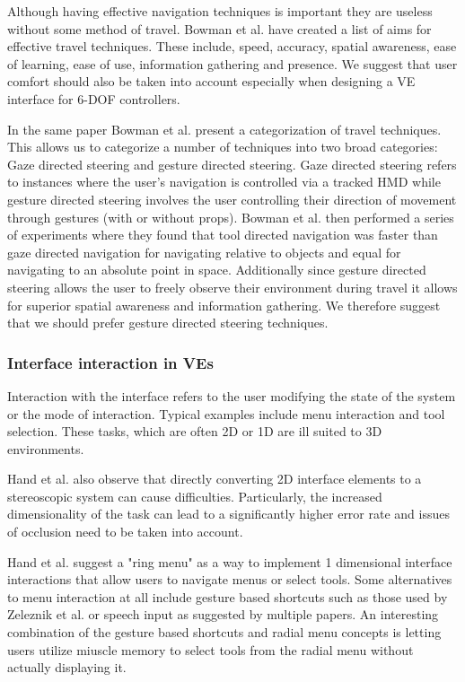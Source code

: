 \documentclass{sig-alternate-05-2015}
\begin{document}
Although having effective navigation techniques is important they are useless without some method of travel. Bowman et al. have created a list of aims for effective travel techniques.\cite{Bowman1997} These include, speed, accuracy, spatial awareness, ease of learning, ease of use, information gathering and presence. We suggest that user comfort should also be taken into account especially when designing a VE interface for 6-DOF controllers.

 In the same paper Bowman et al. present a categorization of travel techniques\cite{Bowman1997}. This allows us to categorize a number of techniques into two broad categories: Gaze directed steering and gesture directed steering. Gaze directed steering refers to instances where the user's navigation is controlled via a tracked HMD while gesture directed  steering involves the user controlling their direction of movement through gestures (with or without props). Bowman et al. then performed a series of experiments where they found that tool directed navigation was faster than gaze directed navigation for navigating relative to objects and equal for navigating to an absolute point in space. Additionally since gesture directed steering allows the user to freely observe their environment during travel it allows for superior spatial awareness and information gathering. We therefore suggest that we should prefer gesture directed steering techniques.


\subsubsection{Interface interaction in VEs}
 Interaction with the interface refers to the user modifying the state of the system or the mode of interaction\cite{Bowman2001}. Typical examples include menu interaction and tool selection. These tasks, which are often 2D or 1D are ill suited to 3D environments\cite{Bowman2001, Hand1997}.
 
 Hand et al. also observe that directly converting 2D interface elements to a stereoscopic system can cause difficulties.\cite{Hand1997} Particularly, the increased dimensionality of the task can lead to a significantly higher error rate and issues of occlusion need to be taken into account.
 
 Hand et al. suggest a "ring menu" as a way to implement 1 dimensional interface interactions that allow users to navigate menus or select tools.\cite{Hand1997} Some alternatives to menu interaction at all include gesture based shortcuts such as those used by Zeleznik et al.\cite{Zeleznik2007} or speech input as suggested by multiple papers. \cite{VanDam1997,Bowman2001,Hand1997} An interesting combination of the gesture based shortcuts and radial menu concepts is letting users utilize miuscle memory to select tools from the radial menu without actually displaying it.\cite{Kurtenbach1993}
 
\end{document}
